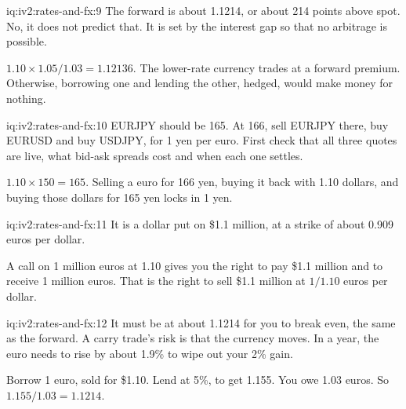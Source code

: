 \begin{solution}{iq:iv2:rates-and-fx:9}
The forward is about 1.1214, or about 214 points above spot. No, it does not predict that. It is set by the interest gap so that no arbitrage is possible.

$1.10 \times 1.05/1.03 = 1.12136$. The lower-rate currency trades at a forward premium. Otherwise, borrowing one and lending the other, hedged, would make money for nothing.

\end{solution}

\begin{solution}{iq:iv2:rates-and-fx:10}
EURJPY should be 165. At 166, sell EURJPY there, buy EURUSD and buy USDJPY, for 1 yen per euro. First check that all three quotes are live, what bid-ask spreads cost and when each one settles.

$1.10 \times 150 = 165$. Selling a euro for 166 yen, buying it back with 1.10 dollars, and buying those dollars for 165 yen locks in 1 yen.

\end{solution}

\begin{solution}{iq:iv2:rates-and-fx:11}
It is a dollar put on \$1.1 million, at a strike of about 0.909 euros per dollar.

A call on 1 million euros at 1.10 gives you the right to pay \$1.1 million and to receive 1 million euros. That is the right to sell \$1.1 million at $1/1.10$ euros per dollar.

\end{solution}

\begin{solution}{iq:iv2:rates-and-fx:12}
It must be at about 1.1214 for you to break even, the same as the forward. A carry trade's risk is that the currency moves. In a year, the euro needs to rise by about 1.9\% to wipe out your 2\% gain.

Borrow 1 euro, sold for \$1.10. Lend at 5\%, to get 1.155. You owe 1.03 euros. So $1.155/1.03 = 1.1214$.

\end{solution}

